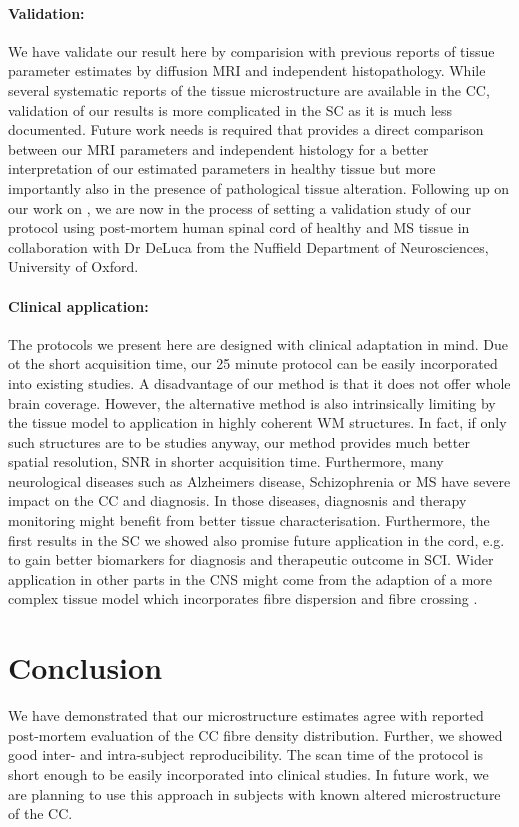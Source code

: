 \paragraph{Validation: } We have validate our result here by comparision with previous reports of tissue parameter estimates by diffusion MRI and independent histopathology. While several systematic reports of the tissue microstructure are available in the CC, validation of our results is more complicated in the SC as it is much less documented. Future work needs is required that provides a direct comparison between our MRI parameters and independent histology for a better interpretation of our estimated parameters in healthy tissue but more importantly also in the presence of pathological tissue alteration. Following up on our work on \SFasym{}, we are now in the process of setting a validation study of our protocol using post-mortem human spinal cord of healthy and MS tissue in collaboration with Dr DeLuca from the Nuffield Department of Neurosciences, University of Oxford.

\paragraph{Clinical application: } The protocols we present here are designed with clinical adaptation in mind. Due ot the short acquisition time, our 25 minute protocol can be easily incorporated into existing studies. A disadvantage of our method is that it does not offer whole brain coverage. However, the alternative \OI{} method is also intrinsically limiting by the tissue model to application in highly coherent WM structures. In fact, if only such structures are to be studies anyway, our method provides much better spatial resolution, SNR in shorter acquisition time. Furthermore, many neurological diseases such as Alzheimers disease, Schizophrenia or MS have severe impact on the CC and diagnosis. In those diseases, diagnosnis and therapy monitoring might benefit from better tissue characterisation. Furthermore, the first results in the SC we showed also promise future application in the cord, e.g. to gain better biomarkers for diagnosis and therapeutic outcome in SCI. Wider application in other parts in the CNS might come from the adaption of a more complex tissue model which incorporates fibre dispersion and fibre crossing \cite{Zhang:2011}.

\section{Conclusion}
We have demonstrated that our microstructure estimates agree with reported post-mortem evaluation of the CC fibre density distribution. Further, we showed good inter- and intra-subject reproducibility. The scan time of the protocol is short enough to be easily incorporated into clinical studies. In future work, we are planning to use this approach in subjects with known altered microstructure of the CC.